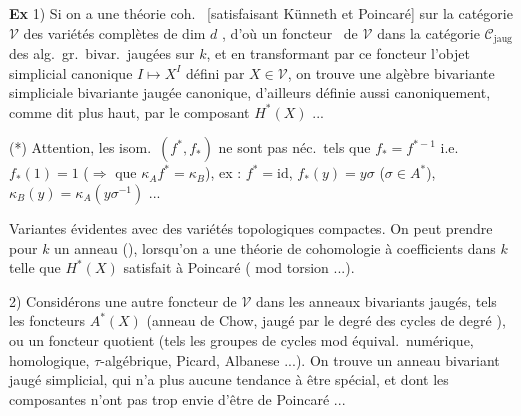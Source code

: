 \documentclass[11pt,a4paper]{article}
\begin{document}

\textbf{Ex} 1) Si on a une théorie coh.\ 
[satisfaisant Künneth et Poincaré] sur la catégorie $\mathcal{V}$ des variétés
complètes \ill{}  de dim $d$
 \struck{\ill{}}, d'où un foncteur \ de $\mathcal{V}$ dans la
catégorie $\mathcal{C}_{\mathrm{jaug}}$ des alg.\ gr.\ bivar.\ jaugées sur
$k$, et en transformant par ce foncteur l'objet simplicial canonique
$I \mapsto X^{I}$ défini par $X \in \mathcal{V}$, on trouve une algèbre
bivariante simpliciale bivariante jaugée canonique, d'ailleurs définie aussi
canoniquement, comme dit plus haut, par le composant $H^{*}(X)$ ...

(*) Attention, les isom.\ $(f^{*}, f_{*})$ ne sont pas néc.\ tels que
$f_{*} = f^{*-1}$ i.e.\ $f_{*}(1) = 1$ ($\Rightarrow$ \struck{\ill{}} que
$\kappa_{A} f^{*} = \kappa_{B}$), ex : $f^{*} = \mathrm{id}$,
$f_{*}(y) = y\sigma$ ($\sigma \in A^{*}$),
$\kappa_{B}(y) = \kappa_{A}(y\sigma^{-1})$ ...


Variantes évidentes avec des variétés topologiques compactes. On peut prendre
pour $k$ un anneau (), lorsqu'on a une théorie de
cohomologie à coefficients dans $k$  telle que
\struck{\ill{}} $H^{*}(X)$ satisfait à Poincaré \struck{\ill{}}
( mod torsion ...).

2) Considérons une autre foncteur de $\mathcal{V}$ dans les anneaux bivariants
jaugés, tels les foncteurs $A^{*}(X)$ (anneau de Chow,  jaugé
par le degré des cycles de degré ), ou un
foncteur quotient (tels les groupes de cycles mod équival.\ numérique,
homologique, $\tau$-algébrique, Picard, Albanese ...). On trouve un anneau
bivariant jaugé simplicial, qui n'a plus aucune tendance à être spécial, et
dont les composantes n'ont pas trop envie d'être de Poincaré ...
\end{document}
